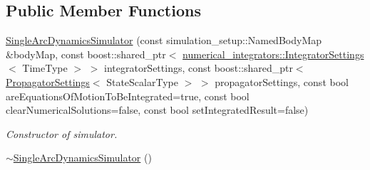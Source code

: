 \subsection*{Public Member Functions}
\begin{DoxyCompactItemize}
\item 
\hyperlink{classtudat_1_1propagators_1_1SingleArcDynamicsSimulator_afca86d14b1e878a7294e7f8f64acdef6}{Single\+Arc\+Dynamics\+Simulator} (const simulation\+\_\+setup\+::\+Named\+Body\+Map \&body\+Map, const boost\+::shared\+\_\+ptr$<$ \hyperlink{classtudat_1_1numerical__integrators_1_1IntegratorSettings}{numerical\+\_\+integrators\+::\+Integrator\+Settings}$<$ Time\+Type $>$ $>$ integrator\+Settings, const boost\+::shared\+\_\+ptr$<$ \hyperlink{classtudat_1_1propagators_1_1PropagatorSettings}{Propagator\+Settings}$<$ State\+Scalar\+Type $>$ $>$ propagator\+Settings, const bool are\+Equations\+Of\+Motion\+To\+Be\+Integrated=true, const bool clear\+Numerical\+Solutions=false, const bool set\+Integrated\+Result=false)
\begin{DoxyCompactList}\small\item\em Constructor of simulator. \end{DoxyCompactList}\item 
\hyperlink{classtudat_1_1propagators_1_1SingleArcDynamicsSimulator_a74d74a7db5ab73da055c09246c55489b}{$\sim$\+Single\+Arc\+Dynamics\+Simulator} ()\hypertarget{classtudat_1_1propagators_1_1SingleArcDynamicsSimulator_a74d74a7db5ab73da055c09246c55489b}{}\label{classtudat_1_1propagators_1_1SingleArcDynamicsSimulator_a74d74a7db5ab73da055c09246c55489b}


\end{DoxyCompactItemize}
